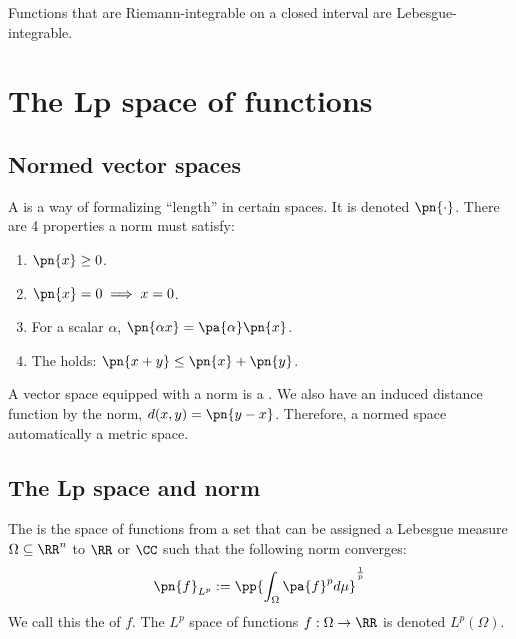 \documentclass{scrartcl}
\begin{document}
\begin{theorem}
    Functions that are Riemann-integrable on a 
    closed interval are Lebesgue-integrable.
\end{theorem}

\section{The Lp space of functions}

\subsection{Normed vector spaces}

\begin{definition}
    A  is a way of formalizing ``length'' in certain spaces. It 
    is denoted $\pn{\cdot}$. 
    There are 4 properties a norm must satisfy:
    \begin{enumerate}
        \item $\pn{x} \geq 0$.
        \item $\pn{x}=0\implies x=0$.
        \item For a scalar $\alpha$, $\pn{\alpha x} = \pa{\alpha}\pn{x}$.
        \item The  holds: $\pn{x+y} \leq \pn{x} + \pn{y}$.
    \end{enumerate}
\end{definition}
A vector space equipped with a norm is a . 
We also have an induced distance function by the norm, 
$d(x,y) = \pn{y-x}$. Therefore, a normed space automatically a metric space.

\subsection{The Lp space and norm}

\begin{definition}
    The  is the space of functions 
    from a set that can be assigned a Lebesgue measure $\Omega \subseteq\RR^n$ to $\RR$ or $\CC$ 
    such that the following norm converges:
    \[
        \pn{f}_{L^p} := \pp{\int_\Omega\pa{f}^pd\mu}^{\frac{1}{p}}
    \]
    We call this the  of $f$. 
    The $L^p$ space of functions $f:\Omega\to \RR$ is denoted $L^p(\Omega)$.
\end{definition}

\end{document}
